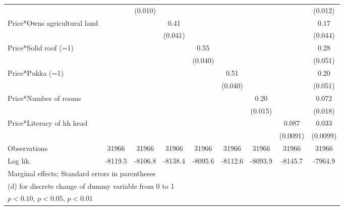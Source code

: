 \begin{table}[htbp]
\begin{tabular*}{1\hsize}{@{\hskip\tabcolsep\extracolsep\fill}l*{8}{c}}
                &                  &  (0.010)         &                  &                  &                  &                  &                  &  (0.012)         \\
Price*Owns agricultural land&                  &                  &     0.41\sym{***}&                  &                  &                  &                  &     0.17\sym{***}\\
                &                  &                  &  (0.041)         &                  &                  &                  &                  &  (0.044)         \\
Price*Solid roof (=1)&                  &                  &                  &     0.55\sym{***}&                  &                  &                  &     0.28\sym{***}\\
                &                  &                  &                  &  (0.040)         &                  &                  &                  &  (0.051)         \\
Price*Pukka (=1)&                  &                  &                  &                  &     0.51\sym{***}&                  &                  &     0.20\sym{***}\\
                &                  &                  &                  &                  &  (0.040)         &                  &                  &  (0.051)         \\
Price*Number of rooms&                  &                  &                  &                  &                  &     0.20\sym{***}&                  &    0.072\sym{***}\\
                &                  &                  &                  &                  &                  &  (0.015)         &                  &  (0.018)         \\
Price*Literacy of hh head&                  &                  &                  &                  &                  &                  &    0.087\sym{***}&    0.033\sym{***}\\
                &                  &                  &                  &                  &                  &                  & (0.0091)         & (0.0099)         \\
\midrule
Observations    &    31966         &    31966         &    31966         &    31966         &    31966         &    31966         &    31966         &    31966         \\
Log lik.        &  -8119.5         &  -8106.8         &  -8138.4         &  -8095.6         &  -8112.6         &  -8093.9         &  -8145.7         &  -7964.9         \\
\bottomrule
\multicolumn{9}{l}{\footnotesize Marginal effects; Standard errors in parentheses}\\
\multicolumn{9}{l}{\footnotesize  (d) for discrete change of dummy variable from 0 to 1}\\
\multicolumn{9}{l}{\footnotesize \sym{*} \(p<0.10\), \sym{**} \(p<0.05\), \sym{***} \(p<0.01\)}\\
\end{tabular*}
\end{table}
